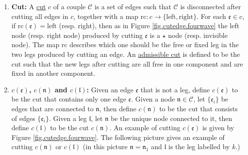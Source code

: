 \begin{defn}
\begin{enumerate}
 \item \textbf{Cut:} A \underline{cut} $c$ of a couple $\mathcal{C}$ is a set of edges such that $\mathcal{C}$ is disconnected after cutting all edges in $c$, together with a map $\text{rc}:c\rightarrow \{\text{left}, \text{right}\}$. For each $\mathfrak{e}\in c$, if $\text{rc}(\mathfrak{e})=\text{left}$ (resp. right), then as in Figure \ref{fig.cutedge.fourwave} the left node (resp. right node) produced by cutting $\mathfrak{e}$ is a $\star$ node (resp. invisible node). The map $\text{rc}$ describes which one should be the free or fixed leg in the two legs produced by cutting an edge. An \underline{admissible cut} is defined to be the cut such that the new legs after cutting are all free in one component and are fixed in another component. 
 \item \textbf{$c(\mathfrak{e})$, $c(\mathfrak{n})$ and $c(\mathfrak{l})$:} Given an edge $\mathfrak{e}$ that is not a leg, define $c(\mathfrak{e})$ to be the cut that contains only one edge $\mathfrak{e}$. Given a node $\mathfrak{n}\in \mathcal{C}$, let $\{\mathfrak{e}_{i}\}$ be edges that are connected to $\mathfrak{n}$, then define $c(\mathfrak{n})$ to be the cut that consists of edges $\{\mathfrak{e}_{i}\}$. Given a leg $\mathfrak{l}$, let $\mathfrak{n}$ be the unique node connected to it, then define $c(\mathfrak{l})$ to be the cut $c(\mathfrak{n})$. An example of cutting $c(\mathfrak{e})$ is given by Figure \ref{fig.cutedge.fourwave}. The following picture gives an example of cutting $c(\mathfrak{n})$ or $c(\mathfrak{l})$ (in this picture $\mathfrak{n}=\mathfrak{n}_1$ and $\mathfrak{l}$ is the leg labelled by $k$.)
 
 \begin{figure}[H]
 \centering
\end{figure}
\end{enumerate}
\end{defn}
